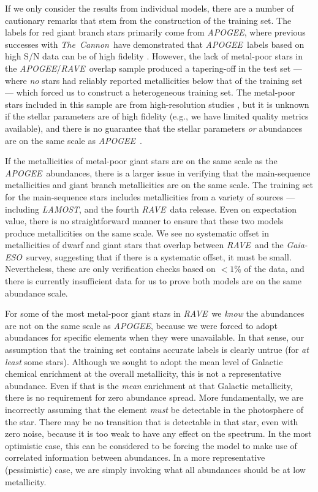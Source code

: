 \documentclass[preprint,trackchanges]{aastex}
\newcommand{\acronym}[1]{{\small{#1}}}
\newcommand{\project}[1]{\textsl{#1}}
\newcommand{\thecannon}{\project{The~Cannon}}
\newcommand{\rave}{\project{\acronym{RAVE}}}
\newcommand{\ges}{\project{Gaia-ESO}}
\newcommand{\apogee}{\project{\acronym{APOGEE}}}
\newcommand{\lamost}{\project{\acronym{LAMOST}}}
\begin{document}
If we only consider the results from individual models, there are a number of cautionary
remarks that stem from the construction of the training set.  The labels for red giant 
branch stars primarily come from \apogee, where previous successes with \thecannon\
have demonstrated that \apogee\ labels based on high S/N data can be of high fidelity
\citep{Ness_2015,Ness_2016,Ho_2016,Casey_2016b}.
However, the lack of metal-poor stars in the \apogee/\rave\ overlap sample produced
a tapering-off in the test set --- where \emph{no} stars had reliably reported metallicities
below that of the training set --- which forced us to construct a heterogeneous training
set.  The metal-poor stars included in this sample are from high-resolution studies
\citep{Fulbright_2010,Ruchti_2011}, but it is unknown if the stellar parameters are
of high fidelity (e.g., we have limited quality metrics available), and there is no
guarantee that the stellar parameters \emph{or} abundances are on the same scale as
\apogee\ \citep[and good reasons to believe they will not be; see][]{Smiljanic_2014}.


If the metallicities of metal-poor giant stars are on the same scale as the \apogee\
abundances, there is a larger issue in verifying that the main-sequence metallicities
and giant branch metallicities are on the same scale.  The training set for the
main-sequence stars includes metallicities from a variety of sources --- including
\lamost, and the fourth \rave\ data release.  Even on expectation value, there is 
no straightforward manner to ensure that these two models produce metallicities on
the same scale.  We see no systematic offset in metallicities of dwarf and giant
stars that overlap between \rave\ and the \ges\ survey, suggesting that if there is
a systematic offset, it must be small. Nevertheless, these are only verification checks based on $<1$\% of the
data, and there is currently insufficient data for us to prove both models are on
the same abundance scale.


For some of the most metal-poor giant stars in \rave\, we \emph{know} the abundances 
are not on the same scale as \apogee, because we were forced to adopt abundances for 
specific elements when they were unavailable.  In that sense, our assumption that the
training set contains accurate labels is clearly untrue (for \emph{at least} some stars).
Although we sought to adopt the mean
level of Galactic chemical enrichment at the overall metallicity, this is not a
representative abundance. Even if that is the \emph{mean} enrichment at that Galactic
metallicity, there is no requirement for zero abundance spread.
More fundamentally, we are incorrectly assuming that the element \emph{must} be 
detectable in the photosphere of the star.  There may be no transition that is 
detectable in that star, even with zero noise, because it is too weak to have any 
effect on the spectrum.  In the most optimistic case, this can be considered to be
forcing the model to make use of correlated information between abundances.  In a
more representative (pessimistic) case, we are simply invoking what all abundances
should be at low metallicity.
\end{document}
